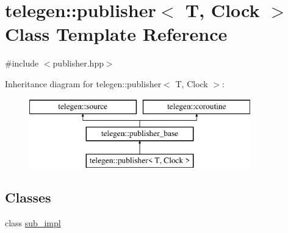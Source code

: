 \hypertarget{classtelegen_1_1publisher}{}\section{telegen\+:\+:publisher$<$ T, Clock $>$ Class Template Reference}
\label{classtelegen_1_1publisher}


{\ttfamily \#include $<$publisher.\+hpp$>$}

Inheritance diagram for telegen\+:\+:publisher$<$ T, Clock $>$\+:\begin{figure}[H]
\begin{center}
\leavevmode
\includegraphics[height=3.000000cm]{classtelegen_1_1publisher}
\end{center}
\end{figure}
\subsection*{Classes}
\begin{DoxyCompactItemize}
\item 
class \hyperlink{classtelegen_1_1publisher_1_1sub__impl}{sub\+\_\+impl}
\end{DoxyCompactItemize}
